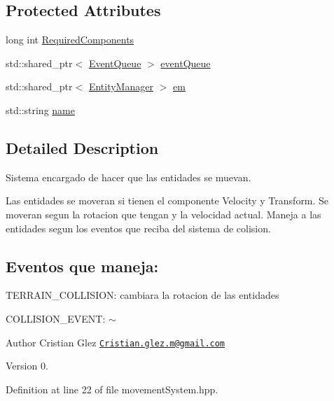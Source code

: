 \subsection*{Protected Attributes}
\begin{DoxyCompactItemize}
\item 
long int \hyperlink{classant_1_1_system_a4ef41cfc496e41ac6730f90629524ec7}{Required\+Components}
\item 
std\+::shared\+\_\+ptr$<$ \hyperlink{classant_1_1_event_queue}{Event\+Queue} $>$ \hyperlink{classant_1_1_system_a27e1814e13d161b5ef0e848e3da16d29}{event\+Queue}
\item 
std\+::shared\+\_\+ptr$<$ \hyperlink{classant_1_1_entity_manager}{Entity\+Manager} $>$ \hyperlink{classant_1_1_system_a5661d872ff769be150bd4e9a9552f6b9}{em}
\item 
std\+::string \hyperlink{classant_1_1_system_a60b3c00a760a3b4947ab1f1fc534a5b2}{name}
\end{DoxyCompactItemize}


\subsection{Detailed Description}
Sistema encargado de hacer que las entidades se muevan. 

Las entidades se moveran si tienen el componente Velocity y Transform. Se moveran segun la rotacion que tengan y la velocidad actual. Maneja a las entidades segun los eventos que reciba del sistema de colision. \subsection*{Eventos que maneja\+:}


\begin{DoxyEnumerate}
\item T\+E\+R\+R\+A\+I\+N\+\_\+\+C\+O\+L\+L\+I\+S\+I\+O\+N\+: cambiara la rotacion de las entidades
\item C\+O\+L\+L\+I\+S\+I\+O\+N\+\_\+\+E\+V\+E\+N\+T\+: $\sim$ \begin{DoxyAuthor}{Author}
Cristian Glez \href{mailto:Cristian.glez.m@gmail.com}{\tt Cristian.\+glez.\+m@gmail.\+com} 
\end{DoxyAuthor}
\begin{DoxyVersion}{Version}
0. 
\end{DoxyVersion}

\end{DoxyEnumerate}

Definition at line 22 of file movement\+System.\+hpp.



